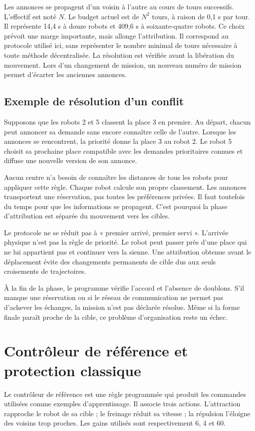 Les annonces se propagent d'un voisin à l'autre au cours de tours successifs. L'effectif est noté $N$. Le budget actuel est de $N^2$ tours, à raison de 0,1 s par tour. Il représente 14,4 s à douze robots et 409,6 s à soixante-quatre robots. Ce choix prévoit une marge importante, mais allonge l'attribution. Il correspond au protocole utilisé ici, sans représenter le nombre minimal de tours nécessaire à toute méthode décentralisée. La résolution est vérifiée avant la libération du mouvement. Lors d'un changement de mission, un nouveau numéro de mission permet d'écarter les anciennes annonces.


\subsection{Exemple de résolution d'un conflit}
Supposons que les robots 2 et 5 classent la place 3 en premier. Au départ, chacun peut annoncer sa demande sans encore connaître celle de l'autre. Lorsque les annonces se rencontrent, la priorité donne la place 3 au robot 2. Le robot 5 choisit sa prochaine place compatible avec les demandes prioritaires connues et diffuse une nouvelle version de son annonce.

Aucun centre n'a besoin de connaître les distances de tous les robots pour appliquer cette règle. Chaque robot calcule son propre classement. Les annonces transportent une réservation, pas toutes les préférences privées. Il faut toutefois du temps pour que les informations se propagent. C'est pourquoi la phase d'attribution est séparée du mouvement vers les cibles.

Le protocole ne se réduit pas à « premier arrivé, premier servi ». L'arrivée physique n'est pas la règle de priorité. Le robot peut passer près d'une place qui ne lui appartient pas et continuer vers la sienne. Une attribution obtenue avant le déplacement évite des changements permanents de cible dus aux seuls croisements de trajectoires.

À la fin de la phase, le programme vérifie l'accord et l'absence de doublons. S'il manque une réservation ou si le réseau de communication ne permet pas d'achever les échanges, la mission n'est pas déclarée résolue. Même si la forme finale paraît proche de la cible, ce problème d'organisation reste un échec.

\section{Contrôleur de référence et protection classique}
Le contrôleur de référence est une règle programmée qui produit les commandes utilisées comme exemples d'apprentissage. Il associe trois actions. L'attraction rapproche le robot de sa cible ; le freinage réduit sa vitesse ; la répulsion l'éloigne des voisins trop proches. Les gains utilisés sont respectivement 6, 4 et 60.

